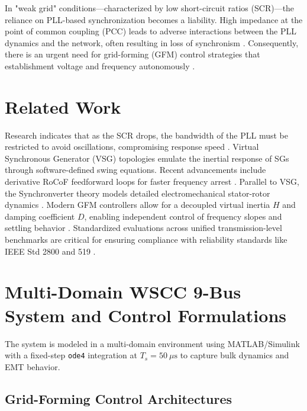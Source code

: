 \documentclass[conference]{IEEEtran}
\begin{document}
In "weak grid" conditions—characterized by low short-circuit ratios (SCR)—the reliance on PLL-based synchronization becomes a liability. High impedance at the point of common coupling (PCC) leads to adverse interactions between the PLL dynamics and the network, often resulting in loss of synchronism \cite{Grid_WSCC_Stability}. Consequently, there is an urgent need for grid-forming (GFM) control strategies that establishment voltage and frequency autonomously \cite{GFM_GFL_Comparison}.

\section{Related Work}\label{sec:related}
Research indicates that as the SCR drops, the bandwidth of the PLL must be restricted to avoid oscillations, compromising response speed \cite{PLL_SmallSignal_WeakGrid}. Virtual Synchronous Generator (VSG) topologies emulate the inertial response of SGs through software-defined swing equations. Recent advancements include derivative RoCoF feedforward loops for faster frequency arrest \cite{VSG_RoCoF_Control}. Parallel to VSG, the Synchronverter theory models detailed electromechanical stator-rotor dynamics \cite{Synchronverter_Dynamics}. Modern GFM controllers allow for a decoupled virtual inertia $H$ and damping coefficient $D$, enabling independent control of frequency slopes and settling behavior \cite{Decoupled_Inertia_Damping}. Standardized evaluations across unified transmission-level benchmarks are critical for ensuring compliance with reliability standards like IEEE Std 2800 and 519 \cite{IEEE_Standards, MultiDomain_CoSim}.

\section{Multi-Domain WSCC 9-Bus System and Control Formulations}\label{sec:methodology}

The system is modeled in a multi-domain environment using MATLAB/Simulink with a fixed-step \texttt{ode4} integration at $T_s = 50\ \mu\text{s}$ to capture bulk dynamics and EMT behavior.

\subsection{Grid-Forming Control Architectures}
\end{document}
